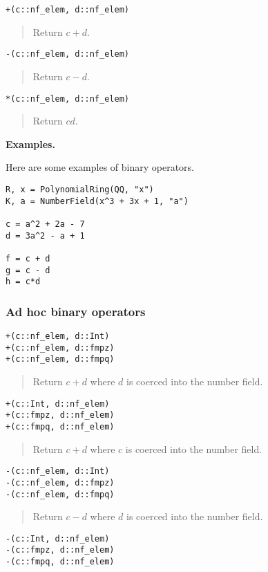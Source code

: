 \documentclass[a4paper,10pt]{article}
\newcommand{\desc}[1]{\vspace{-3mm}\begin{quote}#1\end{quote}}
\begin{document}
{{\begin{lstlisting}
+(c::nf_elem, d::nf_elem)
\end{lstlisting}

\desc{Return $c + d$.}

\begin{lstlisting}
-(c::nf_elem, d::nf_elem)
\end{lstlisting}

\desc{Return $c - d$.}

\begin{lstlisting}
*(c::nf_elem, d::nf_elem)
\end{lstlisting}

\desc{Return $cd$.}

\textbf{Examples.}

Here are some examples of binary operators.

\begin{lstlisting}
R, x = PolynomialRing(QQ, "x")
K, a = NumberField(x^3 + 3x + 1, "a")

c = a^2 + 2a - 7
d = 3a^2 - a + 1

f = c + d
g = c - d
h = c*d
\end{lstlisting}

\subsubsection{Ad hoc binary operators}

\begin{lstlisting}
+(c::nf_elem, d::Int)
+(c::nf_elem, d::fmpz)
+(c::nf_elem, d::fmpq)
\end{lstlisting}

\desc{Return $c + d$ where $d$ is coerced into the number field.}

\begin{lstlisting}
+(c::Int, d::nf_elem)
+(c::fmpz, d::nf_elem)
+(c::fmpq, d::nf_elem)
\end{lstlisting}

\desc{Return $c + d$ where $c$ is coerced into the number field.}

\begin{lstlisting}
-(c::nf_elem, d::Int)
-(c::nf_elem, d::fmpz)
-(c::nf_elem, d::fmpq)
\end{lstlisting}

\desc{Return $c - d$ where $d$ is coerced into the number field.}

\begin{lstlisting}
-(c::Int, d::nf_elem)
-(c::fmpz, d::nf_elem)
-(c::fmpq, d::nf_elem)
\end{lstlisting}

}}
\end{document}
